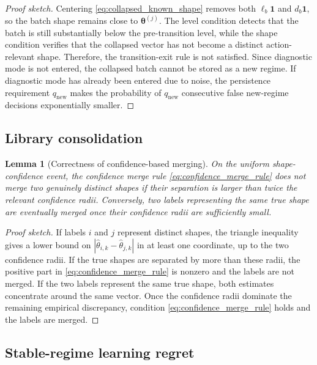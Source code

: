 \documentclass[11pt]{article}
\newtheorem{lemma}{Lemma}
\newcommand{\one}{\bm 1}
\newcommand{\abs}[1]{\left\lvert #1 \right\rvert}
\begin{document}
\begin{proof}[Proof sketch]
Centering \eqref{eq:collapsed_known_shape} removes both $\ell_b\one$ and $d_b\one$, so the batch shape remains close to $\bm\theta^{(j)}$. The level condition detects that the batch is still substantially below the pre-transition level, while the shape condition verifies that the collapsed vector has not become a distinct action-relevant shape. Therefore, the transition-exit rule is not satisfied. Since diagnostic mode is not entered, the collapsed batch cannot be stored as a new regime. If diagnostic mode has already been entered due to noise, the persistence requirement $q_{\mathrm{new}}$ makes the probability of $q_{\mathrm{new}}$ consecutive false new-regime decisions exponentially smaller.
\end{proof}

\subsection{Library consolidation}
\label{subsec:merge_proof}

\begin{lemma}[Correctness of confidence-based merging]
\label{lem:merge_correctness}
On the uniform shape-confidence event, the confidence merge rule \eqref{eq:confidence_merge_rule} does not merge two genuinely distinct shapes if their separation is larger than twice the relevant confidence radii. Conversely, two labels representing the same true shape are eventually merged once their confidence radii are sufficiently small.
\end{lemma}

\begin{proof}[Proof sketch]
If labels $i$ and $j$ represent distinct shapes, the triangle inequality gives a lower bound on $\abs{\widehat\theta_{i,k}-\widehat\theta_{j,k}}$ in at least one coordinate, up to the two confidence radii. If the true shapes are separated by more than these radii, the positive part in \eqref{eq:confidence_merge_rule} is nonzero and the labels are not merged. If the two labels represent the same true shape, both estimates concentrate around the same vector. Once the confidence radii dominate the remaining empirical discrepancy, condition \eqref{eq:confidence_merge_rule} holds and the labels are merged.
\end{proof}

\subsection{Stable-regime learning regret}
\label{subsec:stable_learning_proof}
\end{document}
